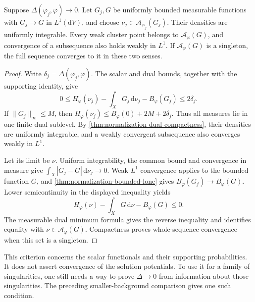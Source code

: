\begin{proposition}\label{prop:normalization-distance-stability}
Suppose $\Delta(\varphi_j,\varphi)\to0$. Let $G_j,G$ be uniformly bounded measurable functions with $G_j\to G$ in $L^1(\mathrm{d}V)$, and choose $\nu_j\in\mathcal A_{\varphi_j}(G_j)$. Their densities are uniformly integrable. Every weak cluster point belongs to $\mathcal A_\varphi(G)$, and convergence of a subsequence also holds weakly in $L^1$. If $\mathcal A_\varphi(G)$ is a singleton, the full sequence converges to it in these two senses.
\end{proposition}
\begin{proof}
Write $\delta_j=\Delta(\varphi_j,\varphi)$. The scalar and dual bounds, together with the supporting identity, give
\[
 0\leq H_\varphi(\nu_j)-\int_XG_j\,\mathrm{d}\nu_j-B_\varphi(G_j)
       \leq2\delta_j.
\]
If $\|G_j\|_\infty\leq M$, then $H_\varphi(\nu_j)\leq B_\varphi(0)+2M+2\delta_j$. Thus all measures lie in one finite dual sublevel. By \cref{thm:normalization-dual-compactness}, their densities are uniformly integrable, and a weakly convergent subsequence also converges weakly in $L^1$.

Let its limit be $\nu$. Uniform integrability, the common bound and convergence in measure give $\int_X|G_j-G|\,\mathrm{d}\nu_j\to0$. Weak $L^1$ convergence applies to the bounded function $G$, and \cref{thm:normalization-bounded-lone} gives $B_\varphi(G_j)\to B_\varphi(G)$. Lower semicontinuity in the displayed inequality yields
\[
 H_\varphi(\nu)-\int_XG\,\mathrm{d}\nu-B_\varphi(G)\leq0.
\]
The measurable dual minimum formula gives the reverse inequality and identifies equality with $\nu\in\mathcal A_\varphi(G)$. Compactness proves whole-sequence convergence when this set is a singleton.
\end{proof}

This criterion concerns the scalar functionals and their supporting probabilities. It does not assert convergence of the solution potentials. To use it for a family of singularities, one still needs a way to prove $\Delta\to0$ from information about those singularities. The preceding smaller-background comparison gives one such condition.
